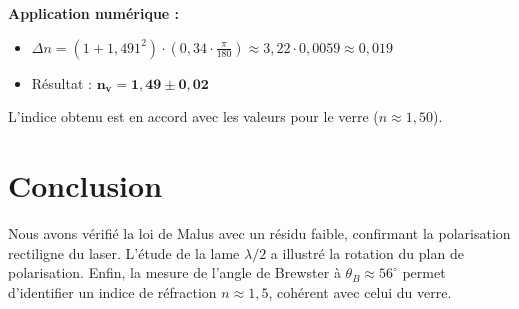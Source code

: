 \documentclass[a4paper,9pt,french]{scrartcl}
\begin{document}
\textbf{Application numérique :}
\begin{itemize}
    \item $\Delta n = (1 + 1,491^2) \cdot (0,34 \cdot \frac{\pi}{180}) \approx 3,22 \cdot 0,0059 \approx 0,019$
    \item Résultat : $\mathbf{n_v = 1,49 \pm 0,02}$
\end{itemize}

L'indice obtenu est en accord avec les valeurs pour le verre ($n \approx 1,50$).

\section{Conclusion}
Nous avons vérifié la loi de Malus avec un résidu faible, confirmant la polarisation rectiligne du laser. L'étude de la lame $\lambda/2$ a illustré la rotation du plan de polarisation. Enfin, la mesure de l'angle de Brewster à $\theta_B \approx 56^\circ$ permet d'identifier un indice de réfraction $n \approx 1,5$, cohérent avec celui du verre.
\end{document}
